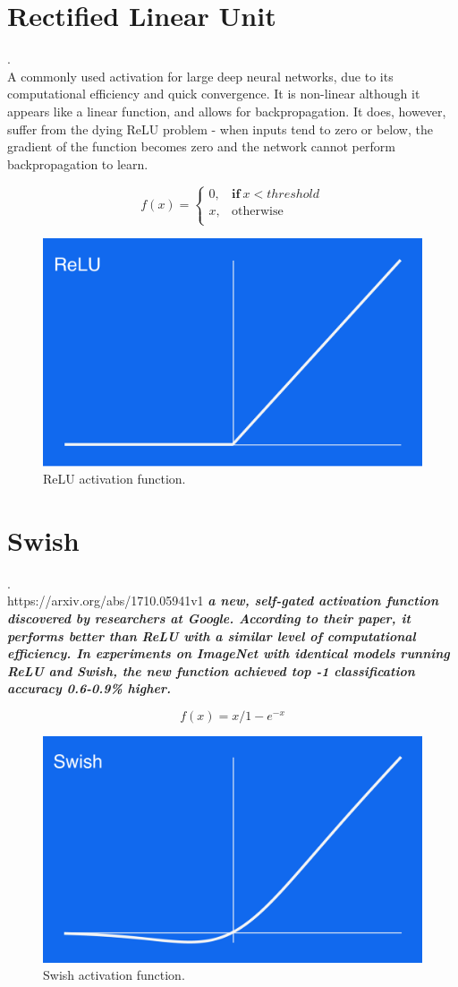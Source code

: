 \section{Rectified Linear Unit}.\\
A commonly used activation for large deep neural networks, due to its computational efficiency and quick convergence. It is non-linear although it appears like a linear function, and allows for backpropagation. It does, however, suffer from the dying ReLU problem - when inputs tend to zero or below, the gradient of the function becomes zero and the network cannot perform backpropagation to learn.

\begin{equation}
f(x) =
    \begin{cases}
      0 , & \mathbf{if} \ x < threshold \\
      x , & \text{otherwise}\\
    \end{cases}
  \end{equation}
\begin{figure}[H]
\centering
\includegraphics[width=.265\textwidth]{relu.png}
\caption{ReLU activation function.}
\end{figure}



\section{Swish}.\\
https://arxiv.org/abs/1710.05941v1
\textbf{\textit{a new, self-gated activation function discovered by researchers at Google. According to their paper, it performs better than ReLU with a similar level of computational efficiency. In experiments on ImageNet with identical models running ReLU and Swish, the new function achieved top -1 classification accuracy 0.6-0.9\% higher.}}

\begin{equation}
f(x) = x/1-e^{-x}
  \end{equation}
\begin{figure}[H]
\centering
\includegraphics[width=.265\textwidth]{swish.png}
\caption{Swish activation function.}
\end{figure}

